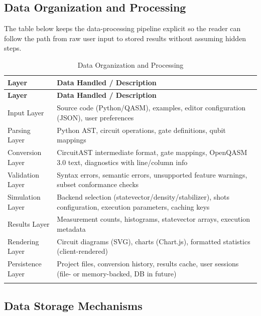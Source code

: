 \subsection{Data Organization and Processing}

The table below keeps the data-processing pipeline explicit so the reader can follow the path from raw user input to stored results without assuming hidden steps.

\begin{longtable}{p{} p{}}
\toprule
\textbf{Layer} & \textbf{Data Handled / Description} \\
\midrule
\endfirsthead
\toprule
\textbf{Layer} & \textbf{Data Handled / Description} \\
\midrule
\endhead
Input Layer & Source code (Python/QASM), examples, editor configuration (JSON), user preferences \\
Parsing Layer & Python AST, circuit operations, gate definitions, qubit mappings \\
Conversion Layer & CircuitAST intermediate format, gate mappings, OpenQASM 3.0 text, diagnostics with line/column info \\
Validation Layer & Syntax errors, semantic errors, unsupported feature warnings, subset conformance checks \\
Simulation Layer & Backend selection (statevector/density/stabilizer), shots configuration, execution parameters, caching keys \\
Results Layer & Measurement counts, histograms, statevector arrays, execution metadata \\
Rendering Layer & Circuit diagrams (SVG), charts (Chart.js), formatted statistics (client-rendered) \\
Persistence Layer & Project files, conversion history, results cache, user sessions (file- or memory-backed, DB in future) \\
\bottomrule
\caption{Data Organization and Processing}
\label{tab:data-organization}
\end{longtable}

\subsection{Data Storage Mechanisms}

